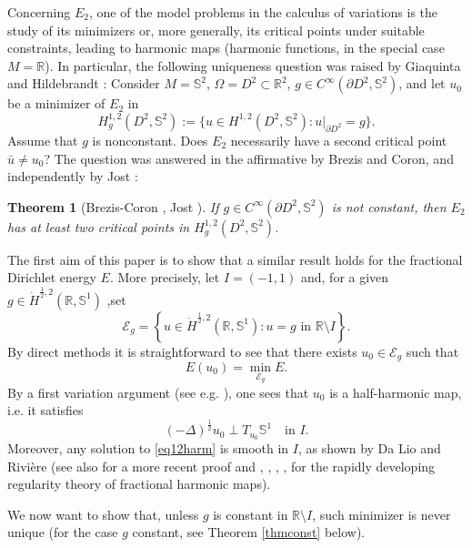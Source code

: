 \documentclass[12pt, a4paper]{article}
\newtheorem{thmx}{Theorem}
\newcommand{\M}[1]{\mathcal{#1}}
\newcommand{\sph}{\mathbb{S}}
\newcommand{\de}{\partial}
\newcommand{\R}{\mathbb{R}}
\renewcommand{\(}{\left(}
\renewcommand{\)}{\right)}
\begin{document}
Concerning $E_2$, one of the model problems in the calculus of variations is the study of its minimizers or, more generally, its critical points under suitable constraints, leading to harmonic maps (harmonic functions, in the special case $M=\R$). In particular, the following uniqueness question was raised by Giaquinta and Hildebrandt \cite{GH}: Consider $M=\sph^2$, $\Omega=D^2\subset\R^2$, $g\in C^\infty(\de D^2,\sph^2)$, and let $u_0$ be a minimizer of $E_2$ in
$$H^{1,2}_g(D^2, \sph^2):=\{u\in H^{1,2}(D^2, \sph^2): u|_{\partial D^2}=g\}.$$
Assume that $g$ is nonconstant. Does $E_2$ necessarily have a second critical point $\bar u\ne u_0$? The question was answered in the affirmative by Brezis and Coron, and independently by Jost \cite{jost}:

\begin{thmx}[Brezis-Coron \cite{bc}, Jost \cite{jost}]\label{thmBC} If $g\in C^\infty(\partial D^2,\sph^2)$ is not constant, then $E_2$ has at least two critical points in $H^{1,2}_g(D^2,\sph^2)$.
\end{thmx}

The first aim of this paper is to show that a similar result holds for the fractional Dirichlet energy $E$.
More precisely, let $I=(-1,1)$ and, for a given $g\in \dot H^{\frac12,2}(\R, \sph^1)$ ,set
$$\mathcal{E}_g= \left\{u\in \dot H^{\frac12,2}(\R, \sph^1):u=g\text{ in }\R\setminus I\right\}.$$
By direct methods it is straightforward to see that there exists $u_0\in \M{E}_g$ such that
$$E(u_0)=\min_{\M{E}_g}E.$$
By a first variation argument (see e.g. \cite[Sec. 1]{milsir}), one sees that $u_0$ is a half-harmonic map, i.e. it satisfies
\begin{equation}\label{eq12harm}
(-\Delta)^\frac12 u_0 \perp T_{u_0}\sph^1\quad \text{in } I.
\end{equation}
Moreover, any solution to \eqref{eq12harm} is smooth in $I$, as shown by Da Lio and Rivi\`ere \cite{DLR} (see also \cite{MazSch0} for a more recent proof and \cite{DLS}, \cite{milpeg}, \cite{milpegsch}, \cite{milsir}, \cite{milsiryu} for the rapidly developing regularity theory of fractional harmonic maps).

We now want to show that, unless $g$ is constant in $\R\setminus I$, such minimizer is never unique (for the case $g$ constant, see Theorem \ref{thmconst} below).%
\end{document}
